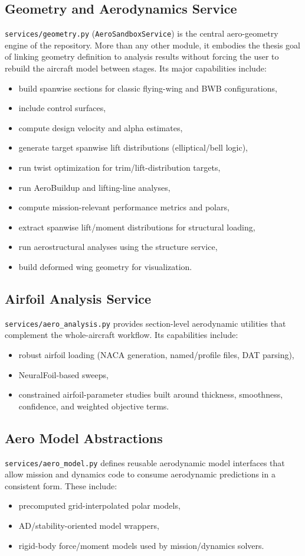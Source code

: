 \subsection{Geometry and Aerodynamics Service}
\texttt{services/geometry.py} (\texttt{AeroSandboxService}) is the central aero-geometry engine of the repository. More than any other module, it embodies the thesis goal of linking geometry definition to analysis results without forcing the user to rebuild the aircraft model between stages. Its major capabilities include:
\begin{itemize}
\item build spanwise sections for classic flying-wing and BWB configurations,
\item include control surfaces,
\item compute design velocity and alpha estimates,
\item generate target spanwise lift distributions (elliptical/bell logic),
\item run twist optimization for trim/lift-distribution targets,
\item run AeroBuildup and lifting-line analyses,
\item compute mission-relevant performance metrics and polars,
\item extract spanwise lift/moment distributions for structural loading,
\item run aerostructural analyses using the structure service,
\item build deformed wing geometry for visualization.
\end{itemize}

\subsection{Airfoil Analysis Service}
\texttt{services/aero\_analysis.py} provides section-level aerodynamic utilities that complement the whole-aircraft workflow. Its capabilities include:
\begin{itemize}
\item robust airfoil loading (NACA generation, named/profile files, DAT parsing),
\item NeuralFoil-based sweeps,
\item constrained airfoil-parameter studies built around thickness, smoothness, confidence, and weighted objective terms.
\end{itemize}

\subsection{Aero Model Abstractions}
\texttt{services/aero\_model.py} defines reusable aerodynamic model interfaces that allow mission and dynamics code to consume aerodynamic predictions in a consistent form. These include:
\begin{itemize}
\item precomputed grid-interpolated polar models,
\item AD/stability-oriented model wrappers,
\item rigid-body force/moment models used by mission/dynamics solvers.
\end{itemize}

